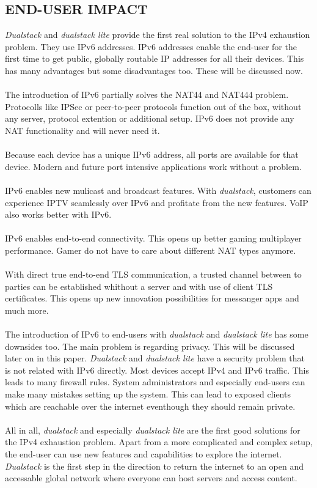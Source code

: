 \documentclass[format=sigconf, natbib=true, nonacm=true]{acmart}
\begin{document}
    \subsection*{END-USER IMPACT}
    \textit{Dualstack} and \textit{dualstack lite} provide the first real solution to the IPv4 exhaustion problem. They use IPv6 addresses. IPv6 addresses enable the end-user for the first time to get public, globally routable IP addresses for all their devices. This has many advantages but some disadvantages too. These will be discussed now.\\\\The introduction of IPv6 partially solves the NAT44 and NAT444 problem. Protocolls like IPSec or peer-to-peer protocols function out of the box, without any server, protocol extention or additional setup. IPv6 does not provide any NAT functionality and will never need it.\\\\Because each device has a unique IPv6 address, all ports are available for that device. Modern and future port intensive applications work without a problem.\\\\IPv6 enables new mulicast and broadcast features. With \textit{dualstack}, customers can experience IPTV seamlessly over IPv6 and profitate from the new features. VoIP also works better with IPv6. \\\\IPv6 enables end-to-end connectivity. This opens up better gaming multiplayer performance. Gamer do not have to care about different NAT types anymore.\\\\With direct true end-to-end TLS communication, a trusted channel between to parties can be established whithout a server and with use of client TLS certificates. This opens up new innovation possibilities for messanger apps and much more.\\\\The introduction of IPv6 to end-users with \textit{dualstack} and \textit{dualstack lite} has some downsides too. The main problem is regarding privacy. This will be discussed later on in this paper. \textit{Dualstack} and \textit{dualstack lite} have a security problem that is not related with IPv6 directly. Most devices accept IPv4 and IPv6 traffic. This leads to many firewall rules. System administrators and especially end-users can make many mistakes setting up the system. This can lead to exposed clients which are reachable over the internet eventhough they should remain private.\\\\All in all, \textit{dualstack} and especially \textit{dualstack lite} are the first good solutions for the IPv4 exhaustion problem. Apart from a more complicated and complex setup, the end-user can use new features and capabilities to explore the internet. \textit{Dualstack} is the first step in the direction to return the internet to an open and accessable global network where everyone can host servers and access content.
\end{document}
